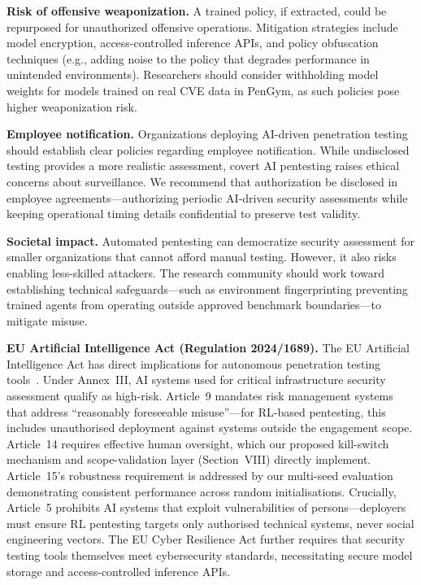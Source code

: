\documentclass[conference]{IEEEtran}
\begin{document}
\textbf{Risk of offensive weaponization.}  A trained policy, if
extracted, could be repurposed for unauthorized offensive operations.
Mitigation strategies include model encryption, access-controlled
inference APIs, and policy obfuscation techniques (e.g., adding noise
to the policy that degrades performance in unintended environments).
Researchers should consider withholding model weights for models
trained on real CVE data in PenGym, as such policies pose higher weaponization risk.

\textbf{Employee notification.}  Organizations deploying AI-driven
penetration testing should establish clear policies regarding employee
notification.  While undisclosed testing provides a more realistic
assessment, covert AI pentesting raises ethical concerns about
surveillance.  We recommend that authorization be disclosed in employee
agreements---authorizing periodic AI-driven security assessments while
keeping operational timing details confidential to preserve test
validity.

\textbf{Societal impact.}  Automated pentesting can democratize
security assessment for smaller organizations that cannot afford manual
testing.  However, it also risks enabling less-skilled attackers.
The research community should work toward establishing technical
safeguards---such as environment fingerprinting preventing trained agents
from operating outside approved benchmark boundaries---to mitigate misuse.

\textbf{EU Artificial Intelligence Act (Regulation 2024/1689).}
The EU Artificial Intelligence Act has direct implications for autonomous
penetration testing tools~\cite{euaiact2024}.  Under Annex~III, AI
systems used for critical infrastructure security assessment qualify as
high-risk.  Article~9 mandates risk management systems that address
``reasonably foreseeable misuse''---for RL-based pentesting, this
includes unauthorised deployment against systems outside the engagement
scope.  Article~14 requires effective human oversight, which our proposed
kill-switch mechanism and scope-validation layer (Section~VIII) directly
implement.  Article~15's robustness requirement is addressed by our
multi-seed evaluation demonstrating consistent performance across random
initialisations.  Crucially, Article~5 prohibits AI systems that exploit
vulnerabilities of persons---deployers must ensure RL pentesting targets
only authorised technical systems, never social engineering vectors.
The EU Cyber Resilience Act further requires that security testing tools
themselves meet cybersecurity standards, necessitating secure model
storage and access-controlled inference APIs.
\end{document}
